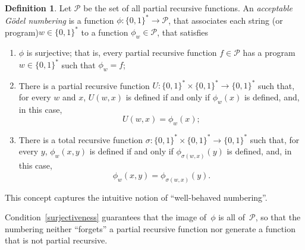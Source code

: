 \documentclass[12pt]{article}
\theoremstyle{definition}
\newtheorem{definition}{Definition}
\begin{document}
\begin{definition}
    Let $\mathcal P$ be the set of all partial recursive functions.
    An \emph{acceptable Gödel numbering}
    is a function $\phi : \{0, 1\}^* \to \mathcal P$,
    that associates each string (or program)\footnotemark $w \in \{0, 1\}^*$
    to a function $\phi_w \in \mathcal P$,
    that satisfies
    \begin{enumerate}
        \item $\phi$ is surjective;
            that is, every partial recursive function $f \in \mathcal P$
            has a program $w \in \{0, 1\}^*$ such that $\phi_w = f$;
            \label{surjectiveness}
        \item There is a partial recursive function
            $U:\{0, 1\}^* \times \{0, 1\}^* \to \{0, 1\}^*$ such that,
            for every $w$ and $x$,
            $U(w, x)$ is defined if and only if $\phi_w(x)$ is defined,
            and, in this case,
            \begin{equation*}
                U(w, x) = \phi_w(x);
            \end{equation*}
            \label{universal-tm}
        \item There is a total recursive function
            $\sigma:\{0, 1\}^* \times \{0, 1\}^* \to \{0, 1\}^*$ such that,
            for every $y$,
            $\phi_w(x, y)$ is defined if and only if $\phi_{\sigma(w, x)}(y)$ is defined,
            and, in this case,
            \begin{equation*}
                \phi_w(x, y) = \phi_{\sigma(w, x)}(y).
            \end{equation*}
            \label{smn-theorem}
    \end{enumerate}
\end{definition}

This concept captures the intuitive notion of
``well-behaved numbering''.

Condition~\ref{surjectiveness}
guarantees that the image of~$\phi$ is all of~$\mathcal P$,
so that the numbering neither ``forgets'' a partial recursive function
nor generate a function that is not partial recursive.
\end{document}
